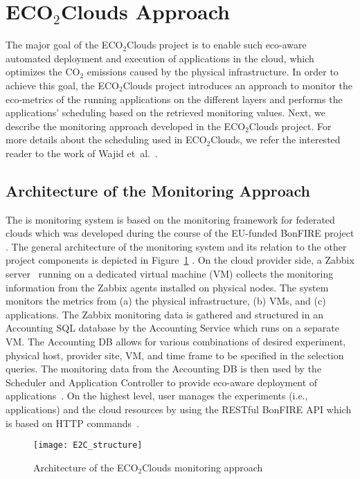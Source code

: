 \documentclass[10pt,letterpaper]{IEEEtran}
\begin{document}
 \section{ECO$_2$Clouds Approach}
\label{sec:e2c_approach}

\noindent
The major goal of the ECO$_2$Clouds project is to enable such eco-aware automated
deployment and execution of applications in the cloud,
which optimizes the $\mathrm{CO_2}$ emissions caused by the physical infrastructure.
In order to achieve this goal, the ECO$_2$Clouds project introduces an approach to monitor the eco-metrics
of the running applications on the different layers
and performs the applications' scheduling based on the retrieved monitoring values.
Next, we describe the monitoring approach developed in the ECO$_2$Clouds project.
For more details about the scheduling used in ECO$_2$Clouds, we refer the interested reader to the work of Wajid et~al.~\cite{Wajid2015}.

\subsection{Architecture of the \ECO Monitoring Approach}

The is \ECO monitoring system is based on the monitoring framework for federated clouds
which was developed during the course of the EU-funded BonFIRE project \cite{HazmiCM12}.
The general architecture of the \ECO monitoring system and its relation
to the other project components is depicted in Figure~\ref{fig:E2C_structure} \cite{TenschertSG14}.
On the cloud provider side, a Zabbix server~\cite{Zabbix} running on a dedicated virtual machine (VM)
collects the monitoring information from the Zabbix agents installed on physical nodes.
The system monitors the metrics from (a) the physical infrastructure, (b) VMs, and (c) applications.
The Zabbix monitoring data is gathered and structured in an Accounting SQL database by
the Accounting Service which runs on a separate VM.
The Accounting DB allows for various combinations of desired experiment,
physical host, provider site, VM, and time frame to be specified in the selection queries. 
The monitoring data from the Accounting DB is then used by the \ECO
Scheduler and Application Controller to provide eco-aware deployment of applications~\cite{Wajid2015}.
On the highest level, user manages the experiments (i.e., applications) and the cloud resources
by using the RESTful BonFIRE API which is based on HTTP commands~\cite{bonfireAPI}.

\begin{figure}
  \begin{center}
    \texttt{[image: E2C\_structure]}
    \caption{Architecture of the ECO$_2$Clouds monitoring approach \cite{TenschertSG14}}
    \label{fig:E2C_structure}
  \end{center}
\end{figure}
\end{document}
